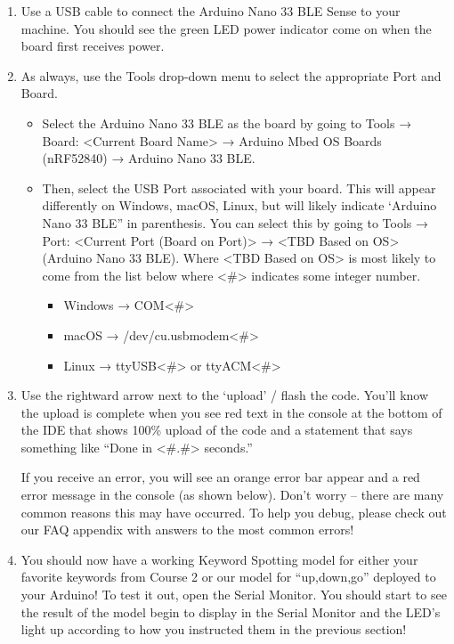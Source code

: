 \begin{enumerate}
  \item Use a USB cable to connect the Arduino Nano 33 BLE Sense to your machine. You should see the green LED power indicator come on when the board first receives power.
  
  \item  As always, use the Tools drop-down menu to select the appropriate Port and Board.
    
     \begin{itemize}
        
        \item Select the Arduino Nano 33 BLE as the board by going to Tools → Board: <Current Board Name> → Arduino Mbed OS Boards (nRF52840) → Arduino Nano 33 BLE.
   
        \item    Then, select the USB Port associated with your board. This will appear differently on Windows, macOS, Linux, but will likely indicate ‘Arduino Nano 33 BLE” in parenthesis. You can select this by going to Tools → Port: <Current Port (Board on Port)> → <TBD Based on OS> (Arduino Nano 33 BLE). Where <TBD Based on OS> is most likely to come from the list below where <\#> indicates some integer number.
    
      \begin{itemize}
        \item Windows → COM<\#>
        \item macOS → /dev/cu.usbmodem<\#>
        \item Linux → ttyUSB<\#> or ttyACM<\#>
       \end{itemize}
    \end{itemize}

    \item Use the rightward arrow next to the ‘upload’ / flash the code. You’ll know the upload is complete when you see red text in the console at the bottom of the IDE that shows 100\% upload of the code and a statement that says something like “Done in <\#.\#> seconds.”
    
    If you receive an error, you will see an orange error bar appear and a red error message in the console (as shown below). Don’t worry -- there are many common reasons this may have occurred. To help you debug, please check out our FAQ appendix with answers to the most common errors!
    
    \item You should now have a working Keyword Spotting model for either your favorite keywords from Course 2 or our model for “up,down,go” deployed to your Arduino! To test it out, open the Serial Monitor. You should start to see the result of the model begin to display in the Serial Monitor and the LED’s light up according to how you instructed them in the previous section!
   
\end{enumerate}
        
